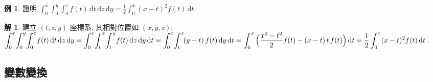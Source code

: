 \documentclass[12pt]{extarticle}
\newcommand{\ds}{\displaystyle}
\theoremstyle{definition}
\newtheorem*{ex}{例}
\newtheorem*{sol}{解}
\begin{document}
{\begin{ex}
  證明 $\ds\int_0^{x}\!\int_0^{y}\!\int_0^{z}\!f(t)\,\text{d}t\,\text{d}z\,\text{d}y = \frac{1}{2}\int_0^{x}(x - t)^2f(t)\,\text{d}t$.
\end{ex}

\begin{sol}
  建立 $(t, z, y)$ 座標系, 其相對位置如 $(x, y, z)$; $\ds\int_0^{x}\!\int_0^{y}\!\int_0^{z}\!f(t)\,\text{d}t\,\text{d}z\,\text{d}y = \int_0^{x}\!\int_t^{x}\!\int_{t}^{y}\!f(t)\,\text{d}z\,\text{d}y\,\text{d}t \\= \int_0^{x}\!\int_t^{x}\!(y - t)\,f(t)\,\text{d}y\,\text{d}t = \int_0^{x}\Big(\frac{x^2 - t^2}{2} f(t) - (x - t)\,t\,f(t)\Big)\,\text{d}t = \frac{1}{2}\int_0^x(x - t)^2 f(t)\,\text{d}t$. 
\end{sol}

}{}

\subsection*{變數變換}
\end{document}
